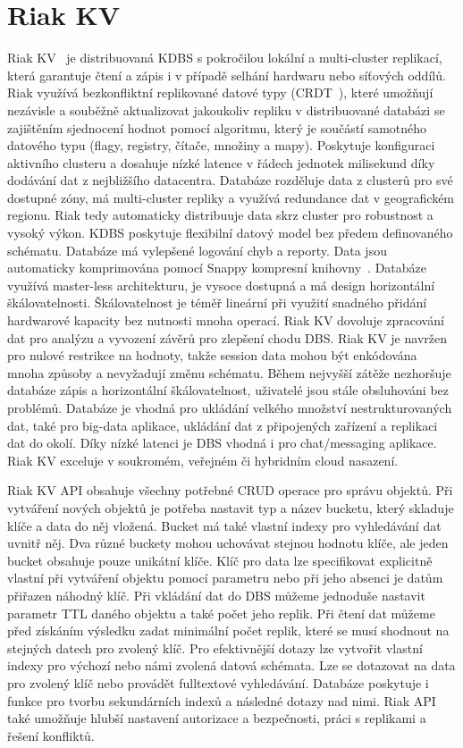 \documentclass[czech,master,dept460,male,csharp,cpdeclaration]{diploma}
\begin{document}
	\section{Riak KV} \label{lab-riak}
	
	Riak KV~\cite{riak} je distribuovaná KDBS s pokročilou lokální a multi-cluster replikací, která garantuje čtení a zápis i v případě selhání hardwaru nebo síťových oddílů. Riak využívá bezkonfliktní replikované datové typy (CRDT~\cite{crdt}), které umožňují nezávisle a souběžně aktualizovat jakoukoliv repliku v distribuované databázi se zajištěním sjednocení hodnot pomocí algoritmu, který je součástí samotného datového typu (flagy, registry, čítače, množiny a mapy). Poskytuje konfiguraci aktivního clusteru a dosahuje nízké latence v řádech jednotek milisekund díky dodávání dat z nejbližšího datacentra. Databáze rozděluje data z clusterů pro své dostupné zóny, má multi-cluster repliky a využívá redundance dat v geografickém regionu. Riak tedy automaticky distribuuje data skrz cluster pro robustnost a vysoký výkon. KDBS poskytuje flexibilní datový model bez předem definovaného schématu. Databáze má vylepšené logování chyb a reporty. Data jsou automaticky komprimována pomocí Snappy kompresní knihovny~\cite{snappy}. Databáze využívá master-less architekturu, je vysoce dostupná a má design horizontální škálovatelnosti. Škálovatelnost je téměř lineární při využití snadného přidání hardwarové kapacity bez nutnosti mnoha operací. Riak KV dovoluje zpracování dat pro analýzu a vyvození závěrů pro zlepšení chodu DBS. Riak KV je navržen pro nulové restrikce na hodnoty, takže session data mohou být enkódována mnoha způsoby a nevyžadují změnu schématu. Během nejvyšší zátěže nezhoršuje databáze zápis a horizontální škálovatelnost, uživatelé jsou stále obsluhováni bez problémů. Databáze je vhodná pro ukládání velkého množství nestrukturovaných dat, také pro big-data aplikace, ukládání dat z připojených zařízení a replikaci dat do okolí. Díky nízké latenci je DBS vhodná i pro chat/messaging aplikace. Riak KV exceluje v soukromém, veřejném či hybridním cloud nasazení.
	
	Riak KV API obsahuje všechny potřebné CRUD operace pro správu objektů. Při vytváření nových objektů je potřeba nastavit typ a název bucketu, který skladuje klíče a data do něj vložená. Bucket má také vlastní indexy pro vyhledávání dat uvnitř něj. Dva různé buckety mohou uchovávat stejnou hodnotu klíče, ale jeden bucket obsahuje pouze unikátní klíče. Klíč pro data lze specifikovat explicitně vlastní při vytváření objektu pomocí parametru nebo při jeho absenci je datům přiřazen náhodný klíč. Při vkládání dat do DBS můžeme jednoduše nastavit parametr TTL daného objektu a také počet jeho replik. Při čtení dat můžeme před získáním výsledku zadat minimální počet replik, které se musí shodnout na stejných datech pro zvolený klíč. Pro efektivnější dotazy lze vytvořit vlastní indexy pro výchozí nebo námi zvolená datová schémata. Lze se dotazovat na data pro zvolený klíč nebo provádět fulltextové vyhledávání. Databáze poskytuje i funkce pro tvorbu sekundárních indexů a následné dotazy nad nimi. Riak API také umožňuje hlubší nastavení autorizace a bezpečnosti, práci s replikami a řešení konfliktů.
	
\end{document}
